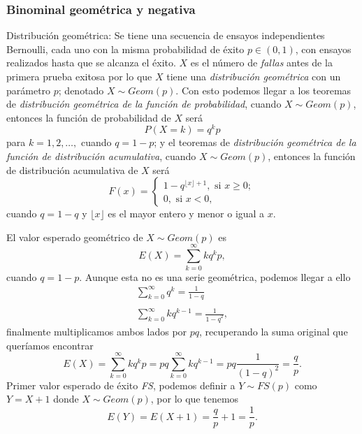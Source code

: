 \subsubsection {Binominal geométrica y negativa}
Distribución geométrica: Se tiene una secuencia de ensayos independientes Bernoulli, cada uno con la misma probabilidad de éxito $p\in(0,1)$, con ensayos realizados hasta que se alcanza el éxito. $X$ es el número de \emph{fallas} antes de la primera prueba exitosa por lo que $X$ tiene una \emph{distribución geométrica} con un parámetro $p$; denotado $X\sim Geom(p)$. Con esto podemos llegar a los teoremas de \emph{distribución geométrica de la función de probabilidad}, cuando $X\sim Geom(p)$, entonces la función de probabilidad de $X$ será
\begin{equation}
P(X=k)=q^kp
\end{equation}
para $k=1,2,\ldots,$ cuando $q=1-p$; y el teoremas de \emph{distribución geométrica de la función de distribución acumulativa}, cuando $X\sim Geom(p)$, entonces la función de distribución acumulativa de $X$ será
    \begin{equation}
    F(x)=
    \begin{cases}
    1-q^{\lfloor x\rfloor+1}, \text{ si } x\geq 0;\\
    0, \text{ si }x < 0,
    \end{cases}
    \end{equation}
cuando $q=1-q$ y $\lfloor x\rfloor$ es el mayor entero y menor o igual a $x$.

El valor esperado geométrico de $X\sim Geom(p)$ es
\begin{equation}
E(X)=\sum_{k=0}^{\infty}kq^kp,
\end{equation}
cuando $q=1-p$. Aunque esta no es una serie geométrica, podemos llegar a ello
\begin{equation}\begin{matrix}
\sum_{k=0}^{\infty}q^k=\frac{1}{1-q}\\
\\
\sum_{k=0}^{\infty}kq^{k-1}=\frac{1}{{1-q}^2},
\end{matrix}
\end{equation}
finalmente multiplicamos ambos lados por $pq$, recuperando la suma original que queríamos encontrar
\begin{equation}
E(X)=\sum_{k=0}^{\infty}kq^kp=pq\sum_{k=0}^{\infty}kq^{k-1}=pq\frac{1}{{(1-q)}^2}=\frac{q}{p}.
\end{equation}
Primer valor esperado de éxito \emph{FS}, podemos definir a $Y\sim FS(p)$ como $Y=X+1$ donde $X\sim Geom(p)$, por lo que tenemos
\begin{equation}
E(Y)=E(X+1)=\frac{q}{p}+1=\frac{1}{p}.
\end{equation}

